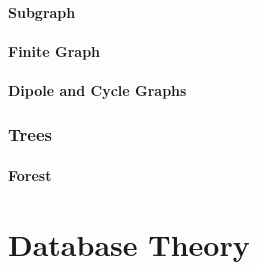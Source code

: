\documentclass{article}
\begin{document}
\subsection{Subgraph} \label{subsec:subgraphs}

\subsection{Finite Graph} \label{subsec:finite_graph}

\subsection{Dipole and Cycle Graphs} \label{subsec:dipole_cycle_graph}



\section{Trees} \label{sec:trees}

\subsection{Forest} \label{subsec:forest}







\part{Database Theory}\label{sec:database_theory}
\end{document}
